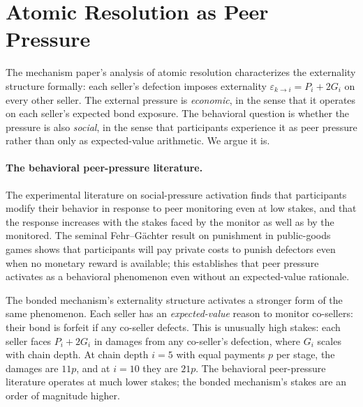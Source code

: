 \documentclass[11pt,a4paper]{article}
\theoremstyle{definition}
\theoremstyle{remark}
\newcommand{\pay}{P}
\newcommand{\cumval}{G}
\begin{document}
\section{Atomic Resolution as Peer Pressure}
\label{sec:peer-pressure}

The mechanism paper's analysis of atomic resolution
characterizes the externality structure formally: each seller's
defection imposes externality $\varepsilon_{k \to i} = \pay_i +
2\cumval_i$ on every other seller. The external pressure is
\emph{economic}, in the sense that it operates on each seller's
expected bond exposure. The behavioral question is whether the
pressure is also \emph{social}, in the sense that participants
experience it as peer pressure rather than only as expected-value
arithmetic. We argue it is.

\paragraph{The behavioral peer-pressure literature.}
The experimental literature on social-pressure activation
\citep{cialdini_goldstein_2004, fehr_gachter_2000} finds that
participants modify their behavior in response to peer monitoring
even at low stakes, and that the response increases with the
stakes faced by the monitor as well as by the monitored. The
seminal Fehr--G\"achter result on punishment in public-goods games
shows that participants will pay private costs to punish defectors
even when no monetary reward is available; this establishes that
peer pressure activates as a behavioral phenomenon even without an
expected-value rationale.

The bonded mechanism's externality structure activates a stronger
form of the same phenomenon. Each seller has an
\emph{expected-value} reason to monitor co-sellers: their bond is
forfeit if any co-seller defects. This is unusually high stakes:
each seller faces $\pay_i + 2\cumval_i$ in damages from any
co-seller's defection, where $\cumval_i$ scales with chain depth.
At chain depth $i = 5$ with equal payments $p$ per stage, the
damages are $11 p$, and at $i = 10$ they are $21 p$. The behavioral
peer-pressure literature operates at much lower stakes; the bonded
mechanism's stakes are an order of magnitude higher.
\end{document}
